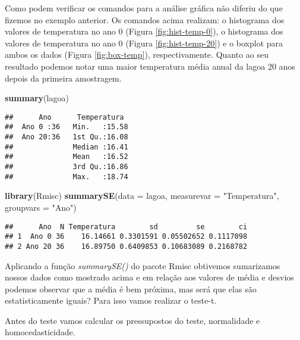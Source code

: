\documentclass[titlepage, oneside, openany, a4paper]{book}
\newenvironment{Shaded}{\begin{snugshade}}{\end{snugshade}}
\newcommand{\DataTypeTok}[1]{\textcolor[rgb]{0.13,0.29,0.53}{#1}}
\newcommand{\KeywordTok}[1]{\textcolor[rgb]{0.13,0.29,0.53}{\textbf{#1}}}
\newcommand{\NormalTok}[1]{#1}
\newcommand{\OperatorTok}[1]{\textcolor[rgb]{0.81,0.36,0.00}{\textbf{#1}}}
\newcommand{\StringTok}[1]{\textcolor[rgb]{0.31,0.60,0.02}{#1}}
\begin{document}
Como podem verificar os comandos para a análise gráfica não diferiu do que fizemos no exemplo anterior. Os comandos acima realizam: o histograma dos valores de temperatura no ano 0 (Figura \ref{fig:hist-temp-0}), o histograma dos valores de temperatura no ano 0 (Figura \ref{fig:hist-temp-20}) e o boxplot para ambos os dados (Figura \ref{fig:box-temp}), respectivamente. Quanto ao seu resultado podemos notar uma maior temperatura média anual da lagoa 20 anos depois da primeira amostragem.

\begin{Shaded}
\begin{Highlighting}[]
\KeywordTok{summary}\NormalTok{(lagoa)}
\end{Highlighting}
\end{Shaded}

\begin{verbatim}
##      Ano      Temperatura   
##  Ano 0 :36   Min.   :15.58  
##  Ano 20:36   1st Qu.:16.08  
##              Median :16.41  
##              Mean   :16.52  
##              3rd Qu.:16.86  
##              Max.   :18.74
\end{verbatim}

\begin{Shaded}
\begin{Highlighting}[]
\KeywordTok{library}\NormalTok{(Rmisc)}
\KeywordTok{summarySE}\NormalTok{(}\DataTypeTok{data =}\NormalTok{ lagoa, }\DataTypeTok{measurevar =} \StringTok{"Temperatura"}\NormalTok{, }\DataTypeTok{groupvars =} \StringTok{"Ano"}\NormalTok{)}
\end{Highlighting}
\end{Shaded}

\begin{verbatim}
##      Ano  N Temperatura        sd         se        ci
## 1  Ano 0 36    16.14661 0.3301591 0.05502652 0.1117098
## 2 Ano 20 36    16.89750 0.6409853 0.10683089 0.2168782
\end{verbatim}

Aplicando a função \emph{summarySE()} do pacote Rmisc obtivemos sumarizamos nossos dados como mostrado acima e em relação aos valores de média e desvios podemos observar que a média é bem próxima, mas será que elas são estatisticamente iguais? Para isso vamos realizar o teste-t.

Antes do teste vamos calcular os pressupostos do teste, normalidade e homocedasticidade.

\begin{Shaded}
\end{Shaded}
\end{document}
